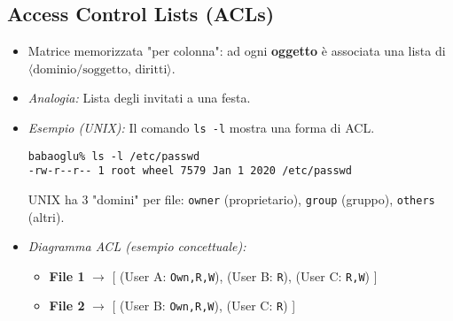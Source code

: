 \subsection{Access Control Lists (ACLs)}
\begin{itemize}
    \item Matrice memorizzata "per colonna": ad ogni \textbf{oggetto} è associata una lista di $\langle \text{dominio/soggetto, diritti} \rangle$.
    \item \textit{Analogia:} Lista degli invitati a una festa.
    \item \textit{Esempio (UNIX):} Il comando \texttt{ls -l} mostra una forma di ACL.
    \begin{verbatim}
babaoglu% ls -l /etc/passwd
-rw-r--r-- 1 root wheel 7579 Jan 1 2020 /etc/passwd
    \end{verbatim}
    UNIX ha 3 "domini" per file: \texttt{owner} (proprietario), \texttt{group} (gruppo), \texttt{others} (altri).
    \item \textit{Diagramma ACL (esempio concettuale):}
    \begin{itemize}
        \item \textbf{File 1} $\rightarrow$ [ (User A: \texttt{Own,R,W}), (User B: \texttt{R}), (User C: \texttt{R,W}) ]
        \item \textbf{File 2} $\rightarrow$ [ (User B: \texttt{Own,R,W}), (User C: \texttt{R}) ]
    \end{itemize}
\end{itemize}

